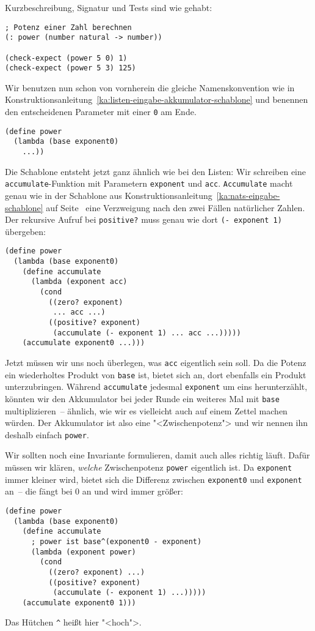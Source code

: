 Kurzbeschreibung, Signatur und Tests sind wie gehabt:
%
\begin{lstlisting}
; Potenz einer Zahl berechnen
(: power (number natural -> number))

(check-expect (power 5 0) 1)
(check-expect (power 5 3) 125)
\end{lstlisting}
%
Wir benutzen nun schon von vornherein die gleiche Namenskonvention wie
in
Konstruktionsanleitung~\ref{ka:listen-eingabe-akkumulator-schablone}
und benennen den entscheidenen Parameter mit einer \lstinline{0} am
Ende.
%
\begin{lstlisting}
(define power
  (lambda (base exponent0)
    ...))
\end{lstlisting}
%
Die Schablone entsteht jetzt ganz ähnlich wie bei den Listen: Wir
schreiben eine \lstinline{accumulate}-Funktion mit Parametern
\lstinline{exponent} und \lstinline{acc}.  \lstinline{Accumulate}
macht genau wie in der Schablone aus
Konstruktionsanleitung~\ref{ka:nats-eingabe-schablone} auf
Seite~\pageref{ka:nats-eingabe-schablone} eine Verzweigung nach den
zwei Fällen natürlicher Zahlen.  Der rekursive Aufruf bei
\lstinline{positive?} muss genau wie dort \lstinline{(- exponent 1)}
übergeben:
%
\begin{lstlisting}
(define power
  (lambda (base exponent0)
    (define accumulate
      (lambda (exponent acc)
        (cond
          ((zero? exponent)
           ... acc ...)
          ((positive? exponent)
           (accumulate (- exponent 1) ... acc ...)))))
    (accumulate exponent0 ...)))
\end{lstlisting}
%
Jetzt müssen wir uns noch überlegen, was \lstinline{acc} eigentlich
sein soll.  Da die Potenz ein wiederholtes Produkt von \lstinline{base}
ist, bietet sich an, dort ebenfalls ein Produkt unterzubringen.
Während \lstinline{accumulate} jedesmal \lstinline{exponent} um eins
herunterzählt, könnten wir den Akkumulator bei jeder Runde ein
weiteres Mal mit \lstinline{base} multiplizieren~-- ähnlich, wie wir
es vielleicht auch auf einem Zettel machen würden.  Der Akkumulator
ist also eine "<Zwischenpotenz"> und wir nennen ihn deshalb einfach
\lstinline{power}.

Wir sollten noch eine Invariante formulieren, damit auch alles richtig
läuft.  Dafür müssen wir klären, \emph{welche} Zwischenpotenz
\lstinline{power} eigentlich ist.  Da \lstinline{exponent} immer
kleiner wird, bietet sich die Differenz zwischen \lstinline{exponent0}
und \lstinline{exponent} an~-- die fängt bei 0 an und wird immer größer:
%
\begin{lstlisting}
(define power
  (lambda (base exponent0)
    (define accumulate
      ; power ist base^(exponent0 - exponent)
      (lambda (exponent power)
        (cond
          ((zero? exponent) ...)
          ((positive? exponent)
           (accumulate (- exponent 1) ...)))))
    (accumulate exponent0 1)))
\end{lstlisting}
%
Das Hütchen \lstinline{^} heißt hier "<hoch">.

